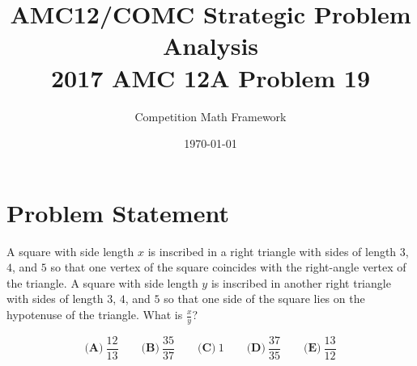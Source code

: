 \documentclass[]{article}
\begin{document}
\title{AMC12/COMC Strategic Problem Analysis\\2017 AMC 12A Problem 19}
\author{Competition Math Framework}
\date{\today}
\maketitle

\section*{Problem Statement}
A square with side length $x$ is inscribed in a right triangle with sides of length $3$, $4$, and $5$ so that one vertex of the square coincides with the right-angle vertex of the triangle. A square with side length $y$ is inscribed in another right triangle with sides of length $3$, $4$, and $5$ so that one side of the square lies on the hypotenuse of the triangle. What is $\frac{x}{y}$?

\[\textbf{(A)}\ \frac{12}{13} \qquad \textbf{(B)}\ \frac{35}{37} \qquad\textbf{(C)}\ 1 \qquad\textbf{(D)}\ \frac{37}{35} \qquad\textbf{(E)}\ \frac{13}{12}\]
\end{document}
